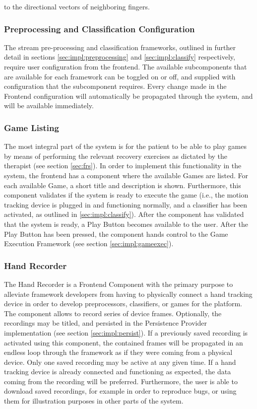 to the directional vectors of neighboring fingers.

\subsubsection{Preprocessing and Classification Configuration}
The stream pre-processing and classification frameworks, outlined in further detail in sections \ref{sec:impl:preprocessing} and \ref{sec:impl:classify} respectively, require user configuration from the frontend. The available subcomponents that are available for each framework can be toggled on or off, and supplied with configuration that the subcomponent requires. Every change made in the Frontend configuration will automatically be propagated through the system, and will be available immediately.

\subsubsection{Game Listing}
The most integral part of the system is for the patient to be able to play games by means of performing the relevant recovery exercises as dictated by the therapist (see section \ref{sec:frs}). In order to implement this functionality in the system, the frontend has a component where the available Games are listed. For each available Game, a short title and description is shown. Furthermore, this component validates if the system is ready to execute the game (i.e., the motion tracking device is plugged in and functioning normally, and a classifier has been activated, as outlined in \ref{sec:impl:classify}). After the component has validated that the system is ready, a Play Button becomes available to the user. After the Play Button has been pressed, the component hands control to the Game Execution Framework (see section \ref{sec:impl:gameexec}).

\subsubsection{Hand Recorder}
The Hand Recorder is a Frontend Component with the primary purpose to alleviate framework developers from having to physically connect a hand tracking device in order to develop preprocessors, classifiers, or games for the platform. The component allows to record series of device frames. Optionally, the recordings may be titled, and persisted in the Persistence Provider implementation (see section \ref{sec:impl:persist}). If a previously saved recording is activated using this component, the contained frames will be propagated in an endless loop through the framework as if they were coming from a physical device. Only one saved recording may be active at any given time. If a hand tracking device is already connected and functioning as expected, the data coming from the recording will be preferred. Furthermore, the user is able to download saved recordings, for example in order to reproduce bugs, or using them for illustration purposes in other parts of the system.

